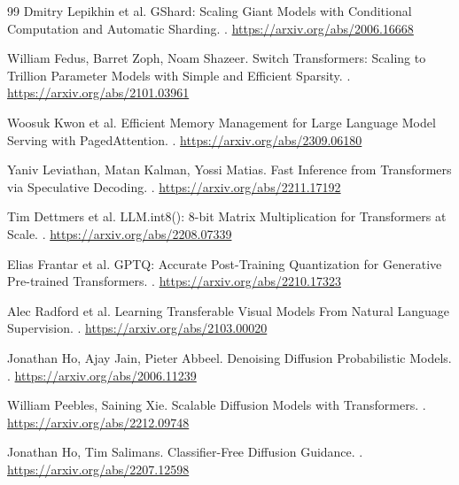 \documentclass[UTF8,12pt]{ctexart}
\newcommand{\1}{\mathbf{1}}
\begin{document}
\begin{thebibliography}{99}
Dmitry Lepikhin et al.
\newblock GShard: Scaling Giant Models with Conditional Computation and Automatic Sharding.
.
\newblock \url{https://arxiv.org/abs/2006.16668}

William Fedus, Barret Zoph, Noam Shazeer.
\newblock Switch Transformers: Scaling to Trillion Parameter Models with Simple and Efficient Sparsity.
.
\newblock \url{https://arxiv.org/abs/2101.03961}

Woosuk Kwon et al.
\newblock Efficient Memory Management for Large Language Model Serving with PagedAttention.
.
\newblock \url{https://arxiv.org/abs/2309.06180}

Yaniv Leviathan, Matan Kalman, Yossi Matias.
\newblock Fast Inference from Transformers via Speculative Decoding.
.
\newblock \url{https://arxiv.org/abs/2211.17192}

Tim Dettmers et al.
\newblock LLM.int8(): 8-bit Matrix Multiplication for Transformers at Scale.
.
\newblock \url{https://arxiv.org/abs/2208.07339}

Elias Frantar et al.
\newblock GPTQ: Accurate Post-Training Quantization for Generative Pre-trained Transformers.
.
\newblock \url{https://arxiv.org/abs/2210.17323}

Alec Radford et al.
\newblock Learning Transferable Visual Models From Natural Language Supervision.
.
\newblock \url{https://arxiv.org/abs/2103.00020}

Jonathan Ho, Ajay Jain, Pieter Abbeel.
\newblock Denoising Diffusion Probabilistic Models.
.
\newblock \url{https://arxiv.org/abs/2006.11239}

William Peebles, Saining Xie.
\newblock Scalable Diffusion Models with Transformers.
.
\newblock \url{https://arxiv.org/abs/2212.09748}

Jonathan Ho, Tim Salimans.
\newblock Classifier-Free Diffusion Guidance.
.
\newblock \url{https://arxiv.org/abs/2207.12598}

\end{thebibliography}
\end{document}
